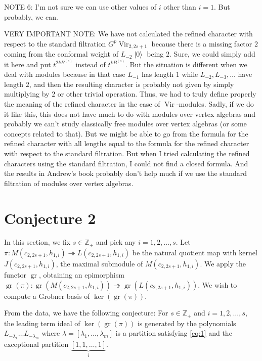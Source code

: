 \documentclass[a4paper, 12pt, reqno]{amsart}
\DeclareMathOperator{\Vir}{Vir}
\DeclareMathOperator{\vac}{|0\rangle}
\DeclareMathOperator{\gr}{gr}
\begin{document}
NOTE 6: I'm not sure we can use other values of $i$ other than $i = 1$.
But probably, we can.

VERY IMPORTANT NOTE: We have not calculated the refined character with respect to the standard filtration $G^p\Vir_{2, 2s + 1}$ because there is a missing factor $2$ coming from the conformal weight of $L_{-2}\vac$ being $2$.
Sure, we could simply add it here and put $t^{2kB^{(s)}}$ instead of $t^{kB^{(s)}}$.
But the situation is different when we deal with modules because in that case $L_{-1}$ has length $1$ while $L_{-2}, L_{-3}, \dots$ have length $2$, and then the resulting character is probably not given by simply multiplying by $2$ or other trivial operation.
Thus, we had to truly define properly the meaning of the refined character in the case of $\Vir$-modules.
Sadly, if we do it like this, this does not have much to do with modules over vertex algebras and probably we can't study classically free modules over vertex algebras (or some concepts related to that).
But we might be able to go from the formula for the refined character with all lengths equal to the formula for the refined character with respect to the standard filtration.
But when I tried calculating the refined characters using the standard filtration, I could not find a closed formula.
And the results in Andrew's book probably don't help much if we use the standard filtration of modules over vertex algebras.

\section{Conjecture 2}
\label{sec:conjecture-2}

In this section, we fix $s \in \mathbb{Z}_+$ and pick any $i = 1, 2, \dots, s$.
Let $\pi: M(c_{2, 2s + 1}, h_{1, i}) \twoheadrightarrow L(c_{2, 2s + 1}, h_{1, i})$ be the natural quotient map with kernel $J(c_{2, 2s + 1}, h_{1, i})$, the maximal submodule of $M(c_{2, 2s + 1}, h_{1, i})$.
We apply the functor $\gr$, obtaining an epimorphism $\gr(\pi): \gr(M(c_{2, 2s + 1}, h_{1, i})) \twoheadrightarrow \gr(L(c_{2, 2s + 1}, h_{1, i}))$.
We wish to compute a Grobner basis of $\ker(\gr(\pi))$.

From the data, we have the following conjecture: For $s \in \mathbb{Z}_+$ and $i = 1, 2, \dots, s$, the leading term ideal of $\ker(\gr(\pi))$ is generated by the polynomials $L_{-\lambda_1} \dots L_{-\lambda_m}$ where $\lambda = [\lambda_1, \dots, \lambda_m]$ is a partition satisfying \eqref{eq:1} and the exceptional partition $\underbrace{[1, 1, \dots, 1]}_i$.
\end{document}
